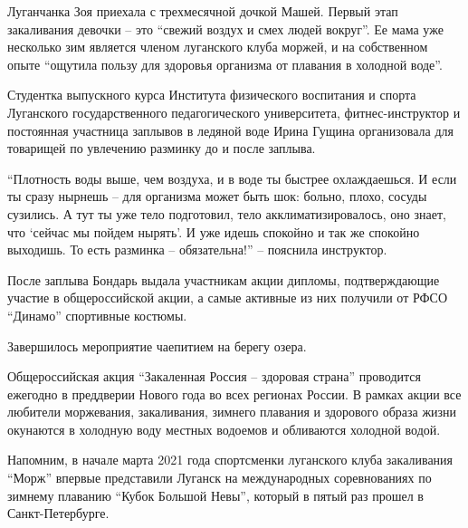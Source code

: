 Луганчанка Зоя приехала с трехмесячной дочкой Машей. Первый этап закаливания
девочки – это \enquote{свежий воздух и смех людей вокруг}. Ее мама уже несколько зим
является членом луганского клуба моржей, и на собственном опыте \enquote{ощутила пользу
для здоровья организма от плавания в холодной воде}.

Студентка выпускного курса Института физического воспитания и спорта Луганского
государственного педагогического университета, фитнес-инструктор и постоянная
участница заплывов в ледяной воде Ирина Гущина организовала для товарищей по
увлечению разминку до и после заплыва.

\enquote{Плотность воды выше, чем воздуха, и в воде ты быстрее охлаждаешься. И если ты
сразу нырнешь – для организма может быть шок: больно, плохо, сосуды сузились. А
тут ты уже тело подготовил, тело акклиматизировалось, оно знает, что \enquote{сейчас мы
пойдем нырять}. И уже идешь спокойно и так же спокойно выходишь. То есть
разминка – обязательна!} – пояснила инструктор.

После заплыва Бондарь выдала участникам акции дипломы, подтверждающие участие в
общероссийской акции, а самые активные из них получили от РФСО \enquote{Динамо}
спортивные костюмы.

Завершилось мероприятие чаепитием на берегу озера.

Общероссийская акция \enquote{Закаленная Россия – здоровая страна} проводится ежегодно
в преддверии Нового года во всех регионах России. В рамках акции все любители
моржевания, закаливания, зимнего плавания и здорового образа жизни окунаются в
холодную воду местных водоемов и обливаются холодной водой.

Напомним, в начале марта 2021 года спортсменки луганского клуба закаливания
\enquote{Морж} впервые представили Луганск на международных соревнованиях по зимнему
плаванию \enquote{Кубок Большой Невы}, который в пятый раз прошел в Санкт-Петербурге. 
